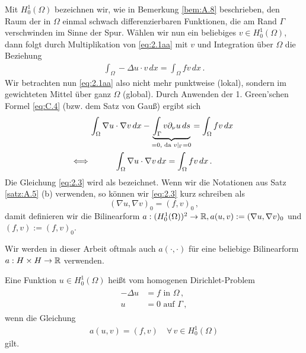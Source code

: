 Mit $H^1_0 (\Omega)$ bezeichnen wir, wie in Bemerkung \ref{bem:A.8} beschrieben, den Raum der in $\Omega$ einmal schwach differenzierbaren Funktionen, die am Rand $\Gamma$ verschwinden im Sinne der Spur. Wählen wir nun ein beliebiges $v \in H^1_0(\Omega)$, dann folgt durch Multiplikation von \eqref{eq:2.1aa} mit $v$ und Integration über $\Omega$ die Beziehung
\begin{align*}
	\int_\Omega -\Delta u \cdot v \, dx = \int_\Omega f v \, dx \, .
\end{align*}
Wir betrachten nun \eqref{eq:2.1aa} also nicht mehr punktweise (lokal), sondern im gewichteten Mittel über ganz $\Omega$ (global). Durch Anwenden der  1. Green'schen Formel \eqref{eq:C.4} (bzw. dem Satz von Gauß) ergibt sich
\begin{align}\notag
	& \int_\Omega \nabla u \cdot \nabla v \, dx -\underbrace{\int_\Gamma v \partial_\nu u \, ds}_{=0, \text{ da } v|_\Gamma = 0} = \int_\Omega f v \, dx \, \\
	\label{eq:2.3}	
	\Longleftrightarrow \, & \quad \qquad \int_\Omega \nabla u \cdot \nabla v \, dx =\int_\Omega f v \, dx \, .
\end{align}
Die Gleichung \eqref{eq:2.3} wird als \textit{} bezeichnet. Wenn wir die Notationen aus Satz \ref{satz:A.5} (b) verwenden, so können wir \eqref{eq:2.3} kurz schreiben als
\[
	(\nabla u, \nabla v)_0 = (f,v)_0 \, ,
\]
damit definieren wir die Bilinearform $a: (H^1_0(\Omega))^2 \rightarrow \mathbb{R}, a(u,v) := (\nabla u, \nabla v)_0$ und $(f,v):=(f,v)_0$.


\begin{bem*}
Wir werden in dieser Arbeit oftmals auch $a(\cdot,\cdot)$ für eine beliebige Bilinearform $a: H\times H\rightarrow \mathbb{R}$ verwenden.
\end{bem*}


\begin{defi}\label{def:2.8}
Eine Funktion $u \in H^1_0(\Omega)$ heißt \textit{} vom homogenen Dirichlet-Problem
\begin{align}\label{eq:DP}\tag{DP}
\begin{aligned}
	-\Delta  u &=  f \text{ in } \Omega \, ,\\
	 u & = 0 \text{ auf } \Gamma \, ,
\end{aligned}
\end{align}
wenn die Gleichung
\begin{align}\label{eq:2.4}
	a(u,v) = (f,v)\quad \forall \, v \in H^1_0(\Omega) 
\end{align}
gilt.
\end{defi}



